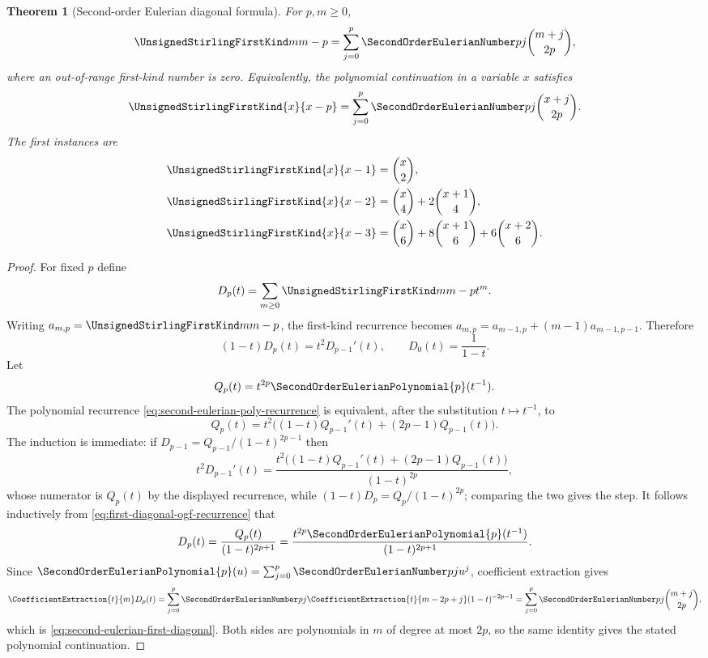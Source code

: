 \documentclass[11pt,a4paper,oneside,openany]{book}
\newtheorem{theorem}{Theorem}[chapter]
\theoremstyle{definition}
\theoremstyle{remark}
\begin{document}
\begin{theorem}[Second-order Eulerian diagonal formula]
\label{thm:second-eulerian-first-diagonal}
For $p,m\ge0$,
\begin{equation}
\label{eq:second-eulerian-first-diagonal}
 \UnsignedStirlingFirstKind m{m-p}
 =\sum_{j=0}^{p}\SecondOrderEulerianNumber pj\binom{m+j}{2p},
\end{equation}
where an out-of-range first-kind number is zero.  Equivalently, the polynomial
continuation in a variable $x$ satisfies
\[
 \UnsignedStirlingFirstKind{x}{x-p}
 =\sum_{j=0}^{p}\SecondOrderEulerianNumber pj\binom{x+j}{2p}.
\]
The first instances are
\begin{align*}
 \UnsignedStirlingFirstKind{x}{x-1}&=\binom{x}{2},\\
 \UnsignedStirlingFirstKind{x}{x-2}&=\binom{x}{4}+2\binom{x+1}{4},\\
 \UnsignedStirlingFirstKind{x}{x-3}&=\binom{x}{6}+8\binom{x+1}{6}
                    +6\binom{x+2}{6}.
\end{align*}
\end{theorem}
\begin{proof}
For fixed $p$ define
\[
 D_p(t)=\sum_{m\ge0}\UnsignedStirlingFirstKind m{m-p}t^m.
\]
Writing $a_{m,p}=\UnsignedStirlingFirstKind m{m-p}$, the first-kind recurrence becomes
$a_{m,p}=a_{m-1,p}+(m-1)a_{m-1,p-1}$.  Therefore
\begin{equation}
\label{eq:first-diagonal-ogf-recurrence}
 (1-t)D_p(t)=t^2D_{p-1}'(t),
 \qquad D_0(t)=\frac1{1-t}.
\end{equation}
Let
\[
 Q_p(t)=t^{2p}\SecondOrderEulerianPolynomial{p}(t^{-1}).
\]
The polynomial recurrence \eqref{eq:second-eulerian-poly-recurrence} is equivalent,
after the substitution $t\mapsto t^{-1}$, to
\[
 Q_p(t)=t^2\bigl((1-t)Q_{p-1}'(t)+(2p-1)Q_{p-1}(t)\bigr).
\]
The induction is immediate: if
$D_{p-1}=Q_{p-1}/(1-t)^{2p-1}$ then
\[
 t^2D_{p-1}'(t)
 =\frac{t^2\bigl((1-t)Q_{p-1}'(t)+(2p-1)Q_{p-1}(t)\bigr)}{(1-t)^{2p}},
\]
whose numerator is $Q_p(t)$ by the displayed recurrence, while
$(1-t)D_p=Q_p/(1-t)^{2p}$; comparing the two gives the step.  It follows
inductively from \eqref{eq:first-diagonal-ogf-recurrence} that
\begin{equation}
\label{eq:first-diagonal-second-eulerian-ogf}
 D_p(t)=\frac{Q_p(t)}{(1-t)^{2p+1}}
 =\frac{t^{2p}\SecondOrderEulerianPolynomial{p}(t^{-1})}{(1-t)^{2p+1}}.
\end{equation}
Since $\SecondOrderEulerianPolynomial{p}(u)=\sum_{j=0}^{p}\SecondOrderEulerianNumber pj u^j$, coefficient extraction gives
\[
 \CoefficientExtraction{t}{m}D_p(t)
 =\sum_{j=0}^{p}\SecondOrderEulerianNumber pj
   \CoefficientExtraction{t}{m-2p+j}(1-t)^{-2p-1}
 =\sum_{j=0}^{p}\SecondOrderEulerianNumber pj\binom{m+j}{2p},
\]
which is \eqref{eq:second-eulerian-first-diagonal}.  Both sides are polynomials in
$m$ of degree at most $2p$, so the same identity gives the stated polynomial
continuation.
\end{proof}
\end{document}
